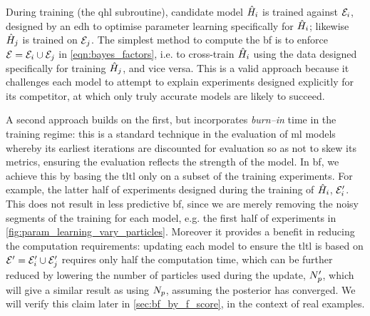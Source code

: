 During training (the \gls{qhl} subroutine), candidate model $\hat{H}_i$ is trained against ${ \mathcal{E} }_i$, 
    designed by an \gls{edh} to optimise parameter learning specifically for $\hat{H}_i$;
    likewise $\hat{H}_j$ is trained on ${ \mathcal{E} }_j$. 
The simplest method to compute the \gls{bf} is to enforce ${ \mathcal{E} }={ \mathcal{E} }_i \cup { \mathcal{E} }_j$ 
    in \cref{eqn:bayes_factors}, i.e. to cross-train $\hat{H}_i$ using the data designed specifically for training $\hat{H}_j$, 
    and vice versa. 
This is a valid approach because it challenges each model to attempt to explain experiments
    designed explicitly for its competitor,   
    at which only truly accurate models are likely to succeed. 
\par 
A second approach builds on the first, but incorporates \emph{burn--in} time in the training regime:
    this is a standard technique in the evaluation of \gls{ml} models whereby its earliest iterations 
    are discounted for evaluation so as not to skew its metrics, 
    ensuring the evaluation reflects the strength of the model. 
In \gls{bf}, we achieve this by basing the \gls{tltl} only on a subset of the training experiments. 
For example, the latter half of experiments designed during the training of $\hat{H}_i$, ${ \mathcal{E} }_i^{\prime}$. 
This does not result in less predictive \gls{bf}, since we are merely removing the 
    noisy segments of the training for each model, e.g. the first half of experiments in \cref{fig:param_learning_vary_particles}. 
Moreover it provides a benefit in reducing the computation requirements: 
    updating each model to ensure the \gls{tltl} is based on ${ \mathcal{E} }^{\prime}={ \mathcal{E} }_i^{\prime} \cup { \mathcal{E} }_j^{\prime}$
    requires only half the computation time, 
    which can be further reduced by lowering the number of particles used during the update, $N_p^{\prime}$, 
    which will give a similar result as using $N_p$, assuming the posterior has converged.
We will verify this claim later in \cref{sec:bf_by_f_score}, in the context of real examples.
\par 

